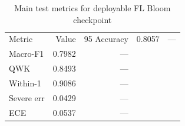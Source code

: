 \begin{table}[t]
\centering
\caption{Main test metrics for deployable FL Bloom checkpoint}
\begin{tabular}{lrr}
\toprule
Metric & Value & 95%
\midrule
Accuracy & 0.8057 & — \\
Macro-F1 & 0.7982 & — \\
QWK & 0.8493 & — \\
Within-1 & 0.9086 & — \\
Severe err & 0.0429 & — \\
ECE & 0.0537 & — \\
\bottomrule
\end{tabular}
\end{table}

